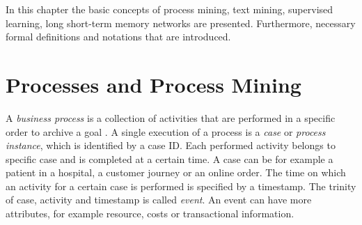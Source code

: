 In this chapter the basic concepts of process mining, text mining, supervised learning, long short-term memory networks are presented. Furthermore, necessary formal definitions and notations that are introduced.




\section{Processes and Process Mining}

A \textit{business process} is a collection of activities that are performed in a specific order to archive a goal \cite{DBLP:conf/bpm/AalstAM11}.
A single execution of a process is a \textit{case} or \textit{process instance}, which is identified by a case ID.
Each performed activity belongs to specific case and is completed at a certain time.
A case can be for example a patient in a hospital, a customer journey or an online order. The time on which an activity for a certain case is performed is specified by a timestamp.
The trinity of case, activity and timestamp is called \textit{event}.
An event can have more attributes, for example resource, costs or transactional information.

